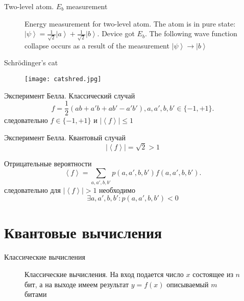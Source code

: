 \documentclass[10pt,pdf,hyperref={unicode}]{beamer}
\begin{document}
\begin{frame}{Two-level atom. $E_b$ measurement}
\begin{figure}
\centering



\caption{Energy measurement for two-level atom. The atom is in pure
  state: $\left|\psi\right> = 
\frac{1}{\sqrt{2}}\left|a\right> + \frac{1}{\sqrt{2}}\left|b\right>$.
Device got $E_b$. The following wave function collapse occurs as a
  result of the measurement $\left|\psi\right> \to \left|b\right>$
}
\label{fig:add:mesure_ex_b}
\end{figure}
\end{frame}

\begin{frame}{Schrödinger's cat}
 \begin{figure} 
   \texttt{[image: catshred.jpg]}
  \end{figure}
\end{frame}

\begin{frame}{Эксперимент Белла. Классический случай}
\[
f = \frac{1}{2}\left(
a b + a' b + a b' - a' b'
\right), a,a',b,b' \in \{-1, +1\}.
\]
следовательно
\(
f \in \{-1, +1\}
\)
и
\(
\left|\left<f\right>\right| \le 1
\)
\end{frame}

\begin{frame}{Эксперимент Белла. Квантовый случай}
\[
\left|\left<f\right>\right| = \sqrt{2} > 1
\]
\end{frame}


\begin{frame}{Отрицательные вероятности}
\[
\left<f\right> = \sum_{a,a',b,b'} p(a,a',b,b') f(a,a',b,b').
\]
следовательно для $\left|\left<f\right>\right| > 1$ необходимо
\[
\exists a,a',b,b': p(a,a',b,b') < 0
\]
\end{frame}

\section{Квантовые вычисления}
\begin{frame}{Классические вычисления}
\begin{figure}
\centering



\caption{Классические вычисления. На вход подается число $x$ состоящее
  из $n$ бит, а на выходе имеем результат $y = f\left(x\right)$ описываемый $m$ битами}
\label{figQuantCompClassComp}
\end{figure}
\end{frame}
\end{document}
